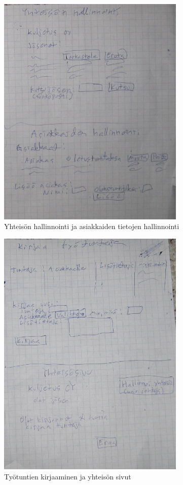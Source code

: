 \documentclass[a4paper, 12pt finnish]{article}
\begin{document}
\begin{figure}[htbp]
    \centering
    \includegraphics[width=0.8\textwidth]{yhthallinnointi.png}
    \caption{\small Yhteisön hallinnointi ja asiakkaiden tietojen
    hallinnointi}
\end{figure}
\begin{figure}[htbp]
    \centering
    \includegraphics[width=0.8\textwidth]{kirjaaminen.png}
    \caption{\small Työtuntien kirjaaminen ja yhteisön sivut}
\end{figure}
\end{document}

